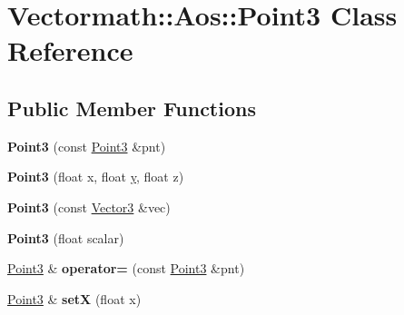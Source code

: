 \hypertarget{class_vectormath_1_1_aos_1_1_point3}{\section{Vectormath\+:\+:Aos\+:\+:Point3 Class Reference}
\label{class_vectormath_1_1_aos_1_1_point3}
}
\subsection*{Public Member Functions}
\begin{DoxyCompactItemize}
\item 
\hypertarget{class_vectormath_1_1_aos_1_1_point3_a03dfaf1fbce8f78dc3569e57034a3fc8}{{\bfseries Point3} (const \hyperlink{class_vectormath_1_1_aos_1_1_point3}{Point3} \&pnt)}\label{class_vectormath_1_1_aos_1_1_point3_a03dfaf1fbce8f78dc3569e57034a3fc8}

\item 
\hypertarget{class_vectormath_1_1_aos_1_1_point3_a52cee9c70e6d12d50c89d1206d06ceb0}{{\bfseries Point3} (float x, float \hyperlink{_ice_utils_8h_aa7ffaed69623192258fb8679569ff9ba}{y}, float z)}\label{class_vectormath_1_1_aos_1_1_point3_a52cee9c70e6d12d50c89d1206d06ceb0}

\item 
\hypertarget{class_vectormath_1_1_aos_1_1_point3_a7ede6b811d45cdbe2cc50a5c2c4d5615}{{\bfseries Point3} (const \hyperlink{class_vectormath_1_1_aos_1_1_vector3}{Vector3} \&vec)}\label{class_vectormath_1_1_aos_1_1_point3_a7ede6b811d45cdbe2cc50a5c2c4d5615}

\item 
\hypertarget{class_vectormath_1_1_aos_1_1_point3_a438b318e3c3209422e75f6305873c349}{{\bfseries Point3} (float scalar)}\label{class_vectormath_1_1_aos_1_1_point3_a438b318e3c3209422e75f6305873c349}

\item 
\hypertarget{class_vectormath_1_1_aos_1_1_point3_a719c9c88b5ab1852dc265e65894a031d}{\hyperlink{class_vectormath_1_1_aos_1_1_point3}{Point3} \& {\bfseries operator=} (const \hyperlink{class_vectormath_1_1_aos_1_1_point3}{Point3} \&pnt)}\label{class_vectormath_1_1_aos_1_1_point3_a719c9c88b5ab1852dc265e65894a031d}

\item 
\hypertarget{class_vectormath_1_1_aos_1_1_point3_a2478cfc20bfe2baf637b1a228442d4b4}{\hyperlink{class_vectormath_1_1_aos_1_1_point3}{Point3} \& {\bfseries set\+X} (float x)}\label{class_vectormath_1_1_aos_1_1_point3_a2478cfc20bfe2baf637b1a228442d4b4}


\end{DoxyCompactItemize}
